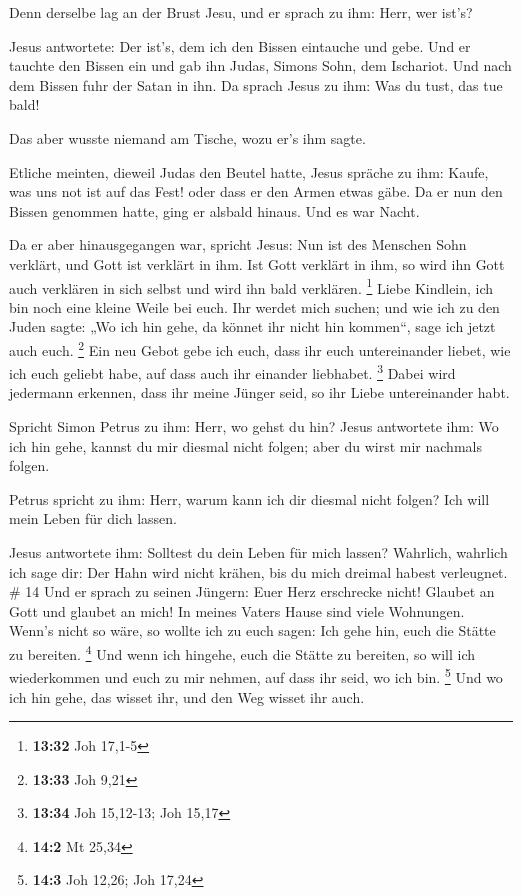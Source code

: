  Denn derselbe lag an der Brust Jesu, und er sprach zu
ihm: Herr, wer ist's?

 Jesus antwortete: Der ist's, dem ich den Bissen
eintauche und gebe. Und er tauchte den Bissen ein und gab ihn Judas,
Simons Sohn, dem Ischariot.  Und nach dem Bissen fuhr der
Satan in ihn. Da sprach Jesus zu ihm: Was du tust, das tue bald!

 Das aber wusste niemand am Tische, wozu er's ihm sagte.

 Etliche meinten, dieweil Judas den Beutel hatte, Jesus
spräche zu ihm: Kaufe, was uns not ist auf das Fest! oder dass er den
Armen etwas gäbe.  Da er nun den Bissen genommen hatte,
ging er alsbald hinaus. Und es war Nacht.

 Da er aber hinausgegangen war, spricht Jesus: Nun ist
des Menschen Sohn verklärt, und Gott ist verklärt in ihm.
 Ist Gott verklärt in ihm, so wird ihn Gott auch
verklären in sich selbst und wird ihn bald verklären. \footnote{\textbf{13:32}
  Joh 17,1-5}  Liebe Kindlein, ich bin noch eine kleine
Weile bei euch. Ihr werdet mich suchen; und wie ich zu den Juden sagte:
„Wo ich hin gehe, da könnet ihr nicht hin kommen``, sage ich jetzt auch
euch. \footnote{\textbf{13:33} Joh 9,21}  Ein neu Gebot
gebe ich euch, dass ihr euch untereinander liebet, wie ich euch geliebt
habe, auf dass auch ihr einander liebhabet. \footnote{\textbf{13:34} Joh
  15,12-13; Joh 15,17}  Dabei wird jedermann erkennen,
dass ihr meine Jünger seid, so ihr Liebe untereinander habt.

 Spricht Simon Petrus zu ihm: Herr, wo gehst du hin?
Jesus antwortete ihm: Wo ich hin gehe, kannst du mir diesmal nicht
folgen; aber du wirst mir nachmals folgen.

 Petrus spricht zu ihm: Herr, warum kann ich dir diesmal
nicht folgen? Ich will mein Leben für dich lassen.

 Jesus antwortete ihm: Solltest du dein Leben für mich
lassen? Wahrlich, wahrlich ich sage dir: Der Hahn wird nicht krähen, bis
du mich dreimal habest verleugnet. \# 14  Und er sprach zu
seinen Jüngern: Euer Herz erschrecke nicht! Glaubet an Gott und glaubet
an mich!  In meines Vaters Hause sind viele Wohnungen.
Wenn's nicht so wäre, so wollte ich zu euch sagen: Ich gehe hin, euch
die Stätte zu bereiten. \footnote{\textbf{14:2} Mt 25,34} 
Und wenn ich hingehe, euch die Stätte zu bereiten, so will ich
wiederkommen und euch zu mir nehmen, auf dass ihr seid, wo ich bin.
\footnote{\textbf{14:3} Joh 12,26; Joh 17,24}  Und wo ich
hin gehe, das wisset ihr, und den Weg wisset ihr auch.

